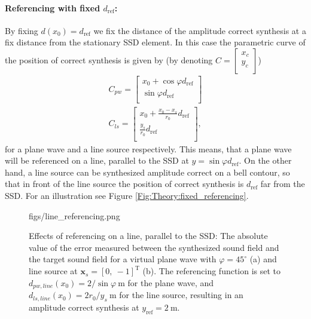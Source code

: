 \documentclass[12pt,a4paper]{article}
\newcommand{\sinfi}{\sin\varphi}
\newcommand{\cosfi}{\cos\varphi}
\newcommand{\yref}{y_{\mathrm{ref}}}
\newcommand{\dref}{d_{\mathrm{ref}}}
\begin{document}
\paragraph{Referencing with fixed $\dref$:\\}
By fixing $d(x_0) = \dref$ we fix the distance of the amplitude correct synthesis at a fix distance from the stationary SSD element. In this case the parametric curve of the position of correct synthesis is given by (by denoting $C = \begin{bmatrix} x_c \\[0.3em] y_c \\[0.3em]    \end{bmatrix} $)
\begin{eqnarray}
C_{pw} =  \begin{bmatrix} x_0 + \cosfi \dref \\[0.3em] \sinfi \dref \\[0.3em]    \end{bmatrix} \\
C_{ls} =  \begin{bmatrix} x_0 + \frac{x_0-x_s}{r_0} \dref \\[0.3em] \frac{y_s}{r_0} \dref \\[0.3em]    \end{bmatrix},
\label{Eq:Fixed_referencing}
\end{eqnarray}
for a plane wave and a line source respectively. This means, that a plane wave will be referenced on a line, parallel to the SSD at $y = \sinfi \dref$. On the other hand, a line source can be synthesized amplitude correct on a bell contour, so that in front of the line source the position of correct synthesis is $\dref$ far from the SSD. For an illustration see Figure \ref{Fig:Theory:fixed_referencing}.

\begin{figure}
	\centering
	\begin{overpic}[width = 1\columnwidth ]{figs/line_referencing.png}
	\scriptsize
	\end{overpic}
\caption{Effects of referencing on a line, parallel to the SSD: The absolute value of the error measured between the synthesized sound field and the target sound field for a virtual plane wave with $\varphi = 45^{\circ}$ (a) and line source at $\mathbf{x}_s = [0,\ -1]^{\mathrm{T}}$ (b). The referencing function is set to $d_{pw,line}(x_0) = 2 / \sinfi ~\mathrm{m}$ for the plane wave, and $d_{ls,line}(x_0) = 2 r_0/y_s ~\mathrm{m}$ for the line source, resulting in an amplitude correct synthesis at $\yref = 2~\mathrm{m}$.}
	\label{Fig:Theory:line_referencing}
\end{figure}
\end{document}
